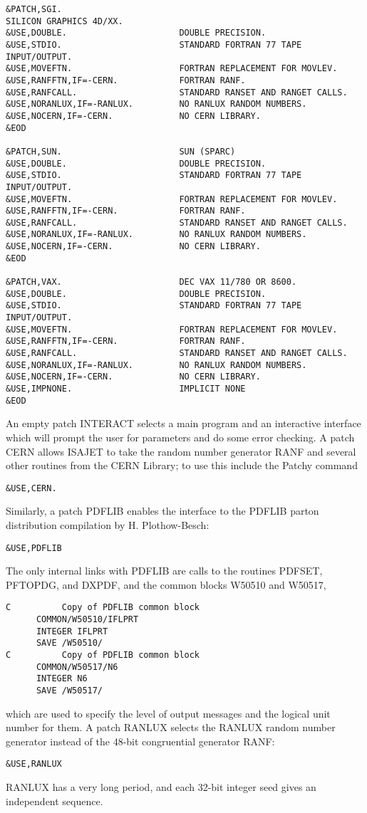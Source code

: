 \begin{verbatim}
&PATCH,SGI.
SILICON GRAPHICS 4D/XX.
&USE,DOUBLE.                      DOUBLE PRECISION.
&USE,STDIO.                       STANDARD FORTRAN 77 TAPE INPUT/OUTPUT.
&USE,MOVEFTN.                     FORTRAN REPLACEMENT FOR MOVLEV.
&USE,RANFFTN,IF=-CERN.            FORTRAN RANF.
&USE,RANFCALL.                    STANDARD RANSET AND RANGET CALLS.
&USE,NORANLUX,IF=-RANLUX.         NO RANLUX RANDOM NUMBERS.
&USE,NOCERN,IF=-CERN.             NO CERN LIBRARY.
&EOD

&PATCH,SUN.                       SUN (SPARC)
&USE,DOUBLE.                      DOUBLE PRECISION.
&USE,STDIO.                       STANDARD FORTRAN 77 TAPE INPUT/OUTPUT.
&USE,MOVEFTN.                     FORTRAN REPLACEMENT FOR MOVLEV.
&USE,RANFFTN,IF=-CERN.            FORTRAN RANF.
&USE,RANFCALL.                    STANDARD RANSET AND RANGET CALLS.
&USE,NORANLUX,IF=-RANLUX.         NO RANLUX RANDOM NUMBERS.
&USE,NOCERN,IF=-CERN.             NO CERN LIBRARY.
&EOD

&PATCH,VAX.                       DEC VAX 11/780 OR 8600.
&USE,DOUBLE.                      DOUBLE PRECISION.
&USE,STDIO.                       STANDARD FORTRAN 77 TAPE INPUT/OUTPUT.
&USE,MOVEFTN.                     FORTRAN REPLACEMENT FOR MOVLEV.
&USE,RANFFTN,IF=-CERN.            FORTRAN RANF.
&USE,RANFCALL.                    STANDARD RANSET AND RANGET CALLS.
&USE,NORANLUX,IF=-RANLUX.         NO RANLUX RANDOM NUMBERS.
&USE,NOCERN,IF=-CERN.             NO CERN LIBRARY.
&USE,IMPNONE.                     IMPLICIT NONE
&EOD
\end{verbatim}

      An empty patch INTERACT selects a main program and an interactive
interface which will prompt the user for parameters and do some error
checking. A patch CERN allows ISAJET to take the random number generator
RANF and several other routines from the CERN Library; to use this
include the Patchy command
\begin{verbatim}
&USE,CERN.
\end{verbatim}
Similarly, a patch PDFLIB enables the interface to the PDFLIB parton
distribution compilation by H. Plothow-Besch:
\begin{verbatim}
&USE,PDFLIB
\end{verbatim}
The only internal links with PDFLIB are calls to the routines PDFSET,
PFTOPDG, and DXPDF, and the common blocks W50510 and W50517,
\begin{verbatim}
C          Copy of PDFLIB common block
      COMMON/W50510/IFLPRT
      INTEGER IFLPRT
      SAVE /W50510/
C          Copy of PDFLIB common block
      COMMON/W50517/N6
      INTEGER N6
      SAVE /W50517/
\end{verbatim}
which are used to specify the level of output messages and the logical
unit number for them. A patch RANLUX selects the RANLUX random number
generator instead of the 48-bit congruential generator RANF:
\begin{verbatim}
&USE,RANLUX
\end{verbatim}
RANLUX has a very long period, and each 32-bit integer seed gives an
independent sequence.

